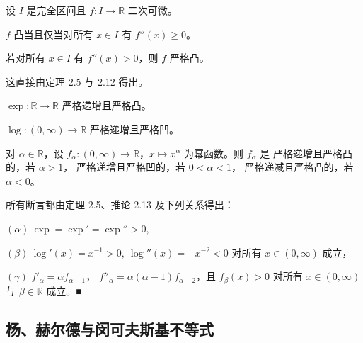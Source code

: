 \begin{corollary}

设 $ I $ 是完全区间且 $ f: I \to \mathbb{R} $ 二次可微。

\begin{subitems}
\item

$f$ 凸当且仅当对所有 $ x \in I $ 有 $ f''(x) \geq 0 $。

\item

若对所有 $ x \in I $ 有 $ f''(x) > 0 $，则 $ f $ 严格凸。

\proofhead
这直接由定理 2.5 与 2.12 得出。
\end{subitems}

\end{corollary}

\begin{example}

\begin{items}
\item

$ \exp: \mathbb{R} \to \mathbb{R} $ 严格递增且严格凸。

\item

$ \log: (0, \infty) \to \mathbb{R} $ 严格递增且严格凹。

\item

对 $ \alpha \in \mathbb{R} $，设 $ f_{\alpha}:(0, \infty) \to \mathbb{R} $，$ x \mapsto x^{\alpha} $ 为幂函数。则 $ f_{\alpha} $ 是
严格递增且严格凸的，若 $ \alpha > 1 $，
严格递增且严格凹的，若 $ 0 < \alpha < 1 $，
严格递减且严格凸的，若 $ \alpha < 0 $。

\end{items}


\proofhead
所有断言都由定理 2.5、推论 2.13 及下列关系得出：

 $ (\alpha)\ \exp = \exp' = \exp'' > 0, $

 $ (\beta)\ \log'(x) = x^{-1} > 0,\ \log''(x) = -x^{-2} < 0 $ 对所有 $ x \in (0, \infty) $ 成立，

 $ (\gamma) $  $ f'_{\alpha} = \alpha f_{\alpha-1} $， $ f''_{\alpha} = \alpha (\alpha-1) f_{\alpha-2} $，且 $ f_{\beta}(x) > 0 $ 对所有 $ x \in (0, \infty) $ 与 $ \beta \in \mathbb{R} $ 成立。■
\end{example}

\subsection*{杨、赫尔德与闵可夫斯基不等式}


